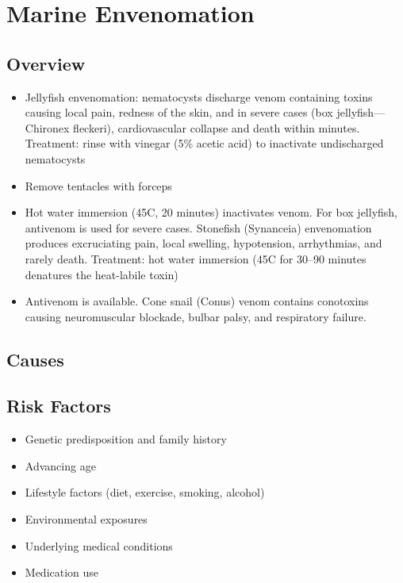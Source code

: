 \chapter{Marine Envenomation}
\label{sec:Marine Envenomation}

\section{Overview}


\begin{itemize}[noitemsep]
  \item Jellyfish envenomation: nematocysts discharge venom containing toxins causing local pain, redness of the skin, and in severe cases (box jellyfish---Chironex fleckeri), cardiovascular collapse and death within minutes. Treatment: rinse with vinegar (5\% acetic acid) to inactivate undischarged nematocysts
  \item Remove tentacles with forceps
  \item Hot water immersion (45\textdegree C, 20 minutes) inactivates venom. For box jellyfish, antivenom is used for severe cases. Stonefish (Synanceia) envenomation produces excruciating pain, local swelling, hypotension, arrhythmias, and rarely death. Treatment: hot water immersion (45\textdegree C for 30--90 minutes denatures the heat-labile toxin)
  \item Antivenom is available. Cone snail (Conus) venom contains conotoxins causing neuromuscular blockade, bulbar palsy, and respiratory failure.
\end{itemize}
\section{Causes}
\section{Risk Factors}

\begin{itemize}[noitemsep]
  \item Genetic predisposition and family history
  \item Advancing age
  \item Lifestyle factors (diet, exercise, smoking, alcohol)
  \item Environmental exposures
  \item Underlying medical conditions
  \item Medication use
\end{itemize}
